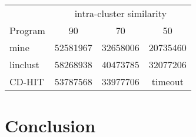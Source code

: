 \documentclass[]{article}
\begin{document}
\begin{table}%
\centering
\begin{tabular}{l c c c}
\toprule
        & \multicolumn{3}{c}{intra-cluster similarity} \\
Program & 90 & 70 & 50 \\
\midrule
mine & 52581967 & 32658006 & 20735460 \\
linclust & 58268938 & 40473785 & 32077206 \\
CD-HIT & 53787568 & 33977706 & timeout \\
\bottomrule
\end{tabular}
\end{table}

\section{Conclusion}



\end{document}
